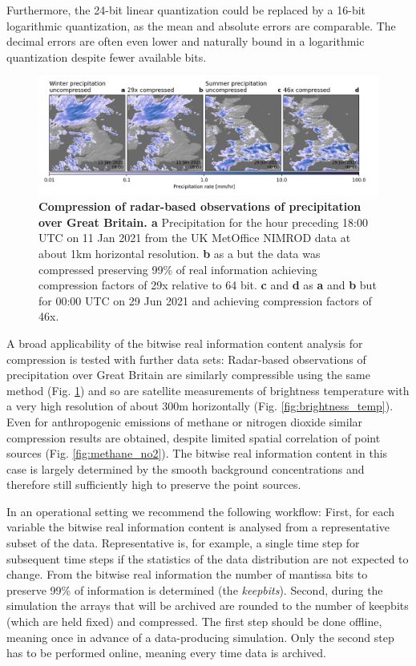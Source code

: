 Furthermore, the 24-bit linear quantization could be replaced by a 16-bit logarithmic quantization, as the mean and absolute errors
are comparable. The decimal errors are often even lower and naturally bound in a logarithmic quantization despite fewer available bits.

\begin{figure}[tbhp]
	\includegraphics[width=1\textwidth]{Figures/compression/precipitation_compression.png}
	\caption{\textbf{Compression of radar-based observations of precipitation over Great Britain. a}
	Precipitation for the hour preceding 18:00 UTC on 11 Jan 2021 from the UK MetOffice NIMROD data at about 1km
	horizontal resolution. \textbf{b} as a but the data was compressed preserving 99\% of real information achieving
	compression factors of 29x relative to 64 bit. \textbf{c} and \textbf{d} as \textbf{a} and \textbf{b} but for 00:00 UTC
	on 29 Jun 2021 and achieving compression factors of 46x.}
	\label{fig:precipitation}
\end{figure}

A broad applicability of the bitwise real information content analysis for compression is tested with further data sets:
Radar-based observations of precipitation over Great Britain are similarly compressible using the same method
(Fig. \ref{fig:precipitation}) and so are satellite measurements of brightness temperature with a very high resolution
of about 300m horizontally (Fig. \ref{fig:brightness_temp}). Even for anthropogenic emissions of methane or nitrogen
dioxide similar compression results are obtained, despite limited spatial correlation of point sources (Fig. \ref{fig:methane_no2}).
The bitwise real information content in this case is largely determined by the smooth background concentrations and
therefore still sufficiently high to preserve the point sources. 

In an operational setting we recommend the following workflow: First, for each variable the bitwise real information
content is analysed from a representative subset of the data. Representative is, for example, a single time step for
subsequent time steps if the statistics of the data distribution are not expected to change. From the bitwise real information
the number of mantissa bits to preserve 99\% of information is determined  (the \emph{keepbits}). Second, during the simulation the
arrays that will be archived are rounded to the number of keepbits (which are held fixed) and compressed. The first step
should be done offline, meaning once in advance of a data-producing simulation. Only the second step has to be performed
online, meaning every time data is archived. 

